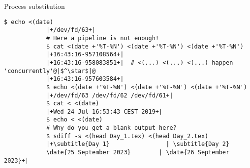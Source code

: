 \begin{frame}[fragile]{Process substitution}
\begin{onlyenv}
\begin{lstlisting}[style=MyBash, aboveskip=0mm, xleftmargin=2mm, xrightmargin=0mm]
            $ echo <(date)
            |+/dev/fd/63+|
            # Here a pipeline is not enough!
            $ cat <(date +'%T-%N') <(date +'%T-%N') <(date +'%T-%N')
            |+16:43:16-957108564+|
            |+16:43:16-958083851+|  # <(...) <(...) <(...) happen 'concurrently'@|$^\star$|@
            |+16:43:16-957603584+|
            $ echo <(date +'%T-%N') <(date +'%T-%N') <(date +'%T-%N')
            |+/dev/fd/63 /dev/fd/62 /dev/fd/61+|
            $ cat < <(date)
            |+Wed 24 Jul 16:53:43 CEST 2019+|
            $ echo < <(date)
            # Why do you get a blank output here?
            $ sdiff -s <(head Day_1.tex) <(head Day_2.tex)
            |+\subtitle{Day 1}                | \subtitle{Day 2}
            \date{25 September 2023}        | \date{26 September 2023}+|
        \end{lstlisting}
    \end{onlyenv}
    \PrepareURLsymbol[PB]
\end{frame}
